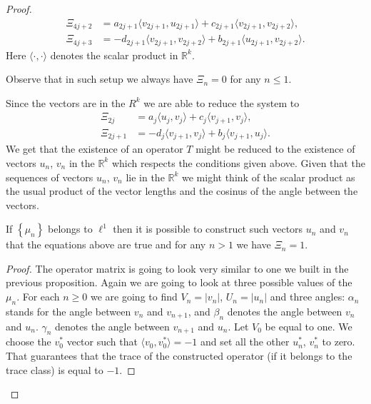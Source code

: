 \documentclass[12pt]{amsart}
\theoremstyle{case}
\begin{document}
\begin{proof}
\begin{align*}
      \Xi_{4j + 2} &= a_{2j+1} \langle v_{2j+1}, u_{2j+1} \rangle + c_{2j+1} \langle v_{2j+1}, v_{2j+2} \rangle,\\
      \Xi_{4j + 3} &= -d_{2j+1} \langle v_{2j+1}, v_{2j+2}\rangle + b_{2j+1} \langle u_{2j+1}, v_{2j+2} \rangle.
    \end{align*}
    Here $\langle\cdot, \cdot\rangle$ denotes the scalar product in $\mathbb{R}^k$.
    \begin{note}
      Observe that in such setup we always have $\Xi_n = 0$ for any $n \leq 1$.
    \end{note}
    Since the vectors are in the $R^k$ we are able to reduce the system to
    \begin{align*}
      \Xi_{2j} &= a_{j} \langle u_{j}, v_{j} \rangle  + c_{j} \langle v_{j+1}, v_{j} \rangle,\\
      \Xi_{2j + 1} &= -d_{j} \langle v_{j+1}, v_{j} \rangle + b_{j} \langle v_{j+1}, u_{j}\rangle.
    \end{align*}
    We get that the existence of an operator $T$ might be reduced to the existence of vectors $u_n$, $v_n$ in the $\mathbb{R}^k$
      which respects the conditions given above.
    Given that the sequences of vectors $u_n$, $v_n$ lie in the $\mathbb{R}^k$ we might think of the scalar product as
      the usual product of the vector lengths and the cosinus of the angle between the vectors.
    \begin{prop}
      \label{k-dim-statement}
      If $\left\{\mu_n\right\}$ belongs to $\ell^1$ then it is possible to construct such vectors $u_n$ and $v_n$ that the equations above are true and for any $n > 1$ we have $\Xi_n = 1$.
    \end{prop}
    \begin{proof}
      The operator matrix is going to look very similar to one we built in the previous proposition.
      Again we are going to look at three possible values of the $\mu_n$.
      For each $n \geq 0$ we are going to find $V_n = |v_n|$, $U_n = |u_n|$ and three angles:
        $\alpha_n$ stands for the angle between $v_n$ and $v_{n + 1}$, and
        $\beta_n$ denotes the angle between $v_n$ and $u_n$.
        $\gamma_n$ denotes the angle between $v_{n + 1}$ and $u_n$.
      Let $V_0$ be equal to one.
      We choose the $v^*_0$ vector such that $\langle v_0, v^*_0 \rangle = -1$ and set all
        the other $u^*_n$, $v^*_n$ to zero.
      That guarantees that the trace of the constructed operator (if it belongs to the trace class) is equal to $-1$.


\end{proof}
\end{proof}
\end{document}
